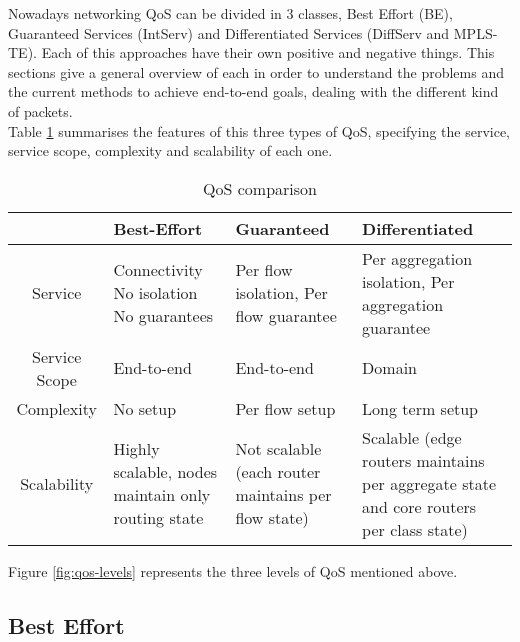Nowadays networking QoS can be divided in 3 classes, Best Effort (BE), Guaranteed Services (IntServ) and Differentiated Services (DiffServ and MPLS-TE). Each of this approaches have their own positive and negative things. This sections give a general overview of each in order to understand the problems and the current methods to achieve end-to-end goals, dealing with the different kind of packets.\\

Table \ref{table:qosComp} summarises the features of this three types of QoS, specifying the service, service scope, complexity and scalability of each one.

\begin{table}[ht] 
\caption{QoS comparison} %
\centering %
\begin{tabular}{c || p{2.5cm} p{3.5cm} p{4.5cm}} %
\hline\hline %
  & Best-Effort & Guaranteed & Differentiated \\ [0.5ex] %
\hline %
Service & Connectivity No isolation  No guarantees & Per flow isolation, Per flow guarantee & Per aggregation isolation, Per aggregation guarantee \\   \hline %
Service Scope & End-to-end & End-to-end & Domain \\   \hline
Complexity & No setup & Per flow setup & Long term setup \\   \hline
Scalability & Highly scalable, nodes maintain only routing state & Not scalable (each router maintains per flow state) & Scalable (edge routers maintains per aggregate state and core routers per class state) \\ [1ex] %
\hline %
\end{tabular} 
\label{table:qosComp} %
\end{table}

Figure \ref{fig:qos-levels} represents the three levels of QoS mentioned above.


\subsection{Best Effort}
\label{sec:be}

